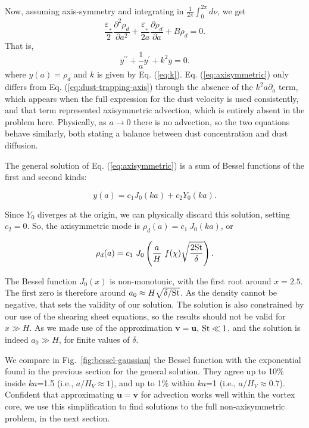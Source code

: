 \documentclass[apj]{emulateapj}
\newcommand{\pderiv}[2]{\frac{\partial #1}{\partial #2}}
\newcommand{\pderivn}[3]{\frac{\partial^{#3} #1}{\partial #2^{#3}}}
\renewcommand{\v}[1]{{\boldsymbol{#1}}} %
\newcommand{\Eq}[1]{Eq. (\ref{#1})}
\newcommand{\eq}[1]{\Eq{#1}}
\newcommand{\Fig}[1]{Fig.~\ref{#1}}
\newcommand{\fig}[1]{\Fig{#1}}
\newcommand{\beq}{\begin{equation}}
\newcommand{\eeq}{\end{equation}}
\newcommand{\epsp}{\varepsilon_{_{+}}}
\newcommand{\St}{{\rm St}}
\begin{document}
Now, assuming axis-symmetry and integrating in
$\frac{1}{2\pi} \int_0^{2\pi} d\nu$, we get  
\beq
\frac{\epsp}{2}\pderivn{\rho_d}{a}{2} +
\frac{\epsp}{2a}\pderiv{\rho_d}{a} + B \rho_d = 0.  
\eeq
That is, 
\beq
y^{\prime\prime} + \frac{1}{a}y^\prime + k^2 y = 0. 
\label{eq:axisymmetric}
\eeq where $y(a) = \rho_d$ and $k$ is given by \eq{eq:k}. 
\eq{eq:axisymmetric} only differs from \eq{eq:dust-trapping-axis} through the
absence of the $k^2a\partial_a$ term, which appears when the full
expression for the dust velocity is used consistently, and that term represented
axisymmetric advection, which is entirely absent in the 
problem here. Physically, as $a\to0$ there is no advection, so the two
equations behave similarly, both stating a balance between dust
concentration and dust diffusion. 

The general solution of \eq{eq:axisymmetric} is a
sum of Bessel functions of the first and second kinds: 

\beq
y(a) = c_1 J_0 (ka) + c_2 Y_0(ka). 
\eeq

\noindent Since  $Y_0$ diverges at the origin, we can physically discard 
this solution, setting $c_2=0$. So, the axisymmetric mode is $\rho_d(a)
= c_1 \ J_0 (ka)$, or

\beq
\rho_d(a) = c_1 \ J_0 \left(\frac{a}{H} \ f(\chi) \sqrt{\frac{2\St}{\delta}}\right).
\eeq 

The Bessel function $J_0(x)$ is
non-monotonic, with the first root around $x=2.5$. The first zero is therefore around
$a_0 \approx H \sqrt{\delta/\St}$.  As the density
cannot be negative, that sets the validity of our solution. 
The solution is also constrained by our use of the shearing sheet
equations, so the results should not be valid for $x \gg H$.
As we made use of the approximation $\v{v}=\v{u}$, $\St \ll 1$,
and the solution  is indeed $a_0 \gg H$, for finite values of $\delta$.

We compare in \fig{fig:bessel-gaussian} the Bessel function with the exponential found in the
previous section for the general solution. They agree up to 10\% inside
$ka$=1.5 (i.e., $a/H_V\approx 1$), and up to 1\% within $ka$=1 (i.e.,
$a/H_V\approx 0.7$). Confident that approximating $\v{u}=\v{v}$ for
advection works well within the vortex core, we use this
simplification to find solutions to the full non-axisymmetric problem,
in the next section. 
\end{document}
